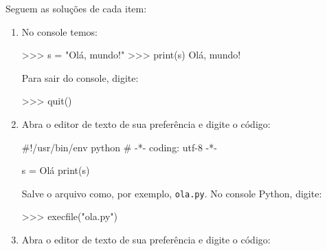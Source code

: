 \documentclass[
  a4paper,
  DIV=11,
  numbers=noendperiod,
  oneside]{scrreprt}
\newenvironment{Shaded}{\begin{snugshade}}{\end{snugshade}}
\newcommand{\BuiltInTok}[1]{\textcolor[rgb]{0.00,0.23,0.31}{#1}}
\newcommand{\CommentTok}[1]{\textcolor[rgb]{0.37,0.37,0.37}{#1}}
\newcommand{\NormalTok}[1]{\textcolor[rgb]{0.00,0.23,0.31}{#1}}
\newcommand{\OperatorTok}[1]{\textcolor[rgb]{0.37,0.37,0.37}{#1}}
\newcommand{\StringTok}[1]{\textcolor[rgb]{0.13,0.47,0.30}{#1}}
\begin{document}
\begin{tcolorbox}[enhanced jigsaw, breakable, left=2mm, leftrule=.75mm, title=\textcolor{quarto-callout-warning-color}{\faExclamationTriangle}\hspace{0.5em}{Resposta}, opacitybacktitle=0.6, titlerule=0mm, opacityback=0, arc=.35mm, coltitle=black, colframe=quarto-callout-warning-color-frame, bottomtitle=1mm, bottomrule=.15mm, rightrule=.15mm, toptitle=1mm, toprule=.15mm, colback=white, colbacktitle=quarto-callout-warning-color!10!white]

Seguem as soluções de cada item:

\begin{enumerate}
\def\labelenumi{\alph{enumi})}
\item
  No console temos:

\begin{Shaded}
\begin{Highlighting}[]
\OperatorTok{\textgreater{}\textgreater{}\textgreater{}}\NormalTok{ s }\OperatorTok{=} \StringTok{"Olá, mundo!"}
\OperatorTok{\textgreater{}\textgreater{}\textgreater{}} \BuiltInTok{print}\NormalTok{(s)}
\NormalTok{Olá, mundo}\OperatorTok{!}
\end{Highlighting}
\end{Shaded}

  Para sair do console, digite:

\begin{Shaded}
\begin{Highlighting}[]
\OperatorTok{\textgreater{}\textgreater{}\textgreater{}}\NormalTok{ quit()}
\end{Highlighting}
\end{Shaded}
\item
  Abra o editor de texto de sua preferência e digite o código:

\begin{Shaded}
\begin{Highlighting}[]
\CommentTok{\#!/usr/bin/env python}
\CommentTok{\# {-}*{-} coding: utf{-}8 {-}*{-}}

\NormalTok{s }\OperatorTok{=} \StringTok{\textquotesingle{}Olá\textquotesingle{}}
\BuiltInTok{print}\NormalTok{(s)}
\end{Highlighting}
\end{Shaded}

  Salve o arquivo como, por exemplo, \texttt{ola.py}. No console Python,
  digite:

\begin{Shaded}
\begin{Highlighting}[]
\OperatorTok{\textgreater{}\textgreater{}\textgreater{}} \BuiltInTok{execfile}\NormalTok{(}\StringTok{"ola.py"}\NormalTok{)}
\end{Highlighting}
\end{Shaded}
\item
  Abra o editor de texto de sua preferência e digite o código:


\end{enumerate}
\end{tcolorbox}
\end{document}
